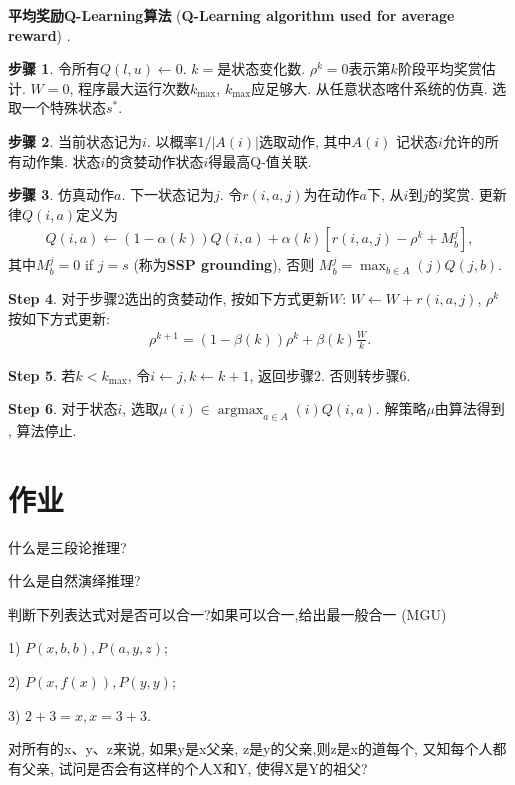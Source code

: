 \textbf{平均奖励Q-Learning算法} (\textbf{Q-Learning algorithm used for average reward}) \cite{gosavi2004reinforcement}.

\textbf{步骤 1}. 令所有$Q(l,u) \leftarrow 0$. $k=$是状态变化数. $\rho^k=0$表示第$k$阶段平均奖赏估计. $W=0$, 程序最大运行次数$k_{\max}$, $k_{\max}$应足够大. 从任意状态喀什系统的仿真. 选取一个特殊状态$s^{*}$.

\textbf{步骤 2}. 当前状态记为$i$. 以概率$1/|A (i)|$选取动作, 其中$A(i)$ 记状态$i$允许的所有动作集. 状态$i$的贪婪动作状态$i$得最高Q-值关联.

\textbf{步骤 3}. 仿真动作$a$. 下一状态记为$j$. 令$r(i, a, j)$为在动作$a$下, 从$i$到$j$的奖赏. 更新律$Q(i,a)$定义为
\begin{eqnarray}
  Q(i,a)\leftarrow (1-\alpha(k))Q(i,a)+\alpha(k)[r(i,a,j)-\rho^k+M_b^j],
\end{eqnarray}
其中$M_b^j= 0$ if $j = s$ (称为\textbf{SSP grounding}), 否则 $M^j_b= \max_{b\in A}(j)Q(j,b)$.

\textbf{Step 4}. 对于步骤2选出的贪婪动作, 按如下方式更新$W$: $W \leftarrow W + r(i, a, j)$, $\rho^k$按如下方式更新:
\begin{eqnarray}
  \rho^{k+1}= (1 - \beta(k))\rho^k+ \beta(k)\frac{W}{k}.
\end{eqnarray}

\textbf{Step 5}. 若$k < k_{\max}$, 令$i \leftarrow j, k \leftarrow k + 1$, 返回步骤2. 否则转步骤6.

\textbf{Step 6}. 对于状态$i$, 选取$\mu(i)\in  \mathop{\arg\max}_{a\in A }(i)Q(i, a)$. 解策略$\mu$由算法得到 , 算法停止.

\section{作业}

\begin{think}
 什么是三段论推理?
\end{think}

\begin{think}
  什么是自然演绎推理?
\end{think}

\begin{think}
判断下列表达式对是否可以合一?如果可以合一,给出最一般合一 (MGU)

1) $P(x,b,b), P(a, y, z)$;

2) $P(x,f(x)),P(y,y)$;

3) $2+3=x,x=3+3$.
\end{think}

\begin{think}
  对所有的x、y、z来说, 如果y是x父亲, z是y的父亲,则z是x的道每个, 又知每个人都有父亲, 试问是否会有这样的个人X和Y, 使得X是Y的祖父?
\end{think}
